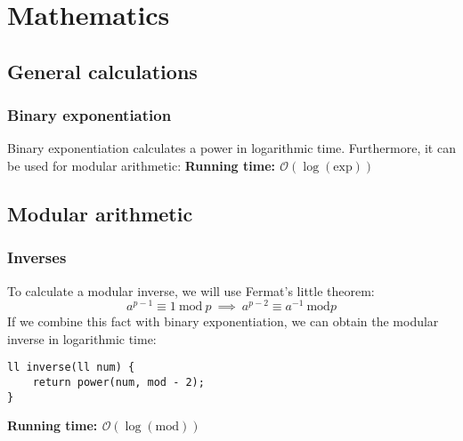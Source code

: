 \chapter{Mathematics}

\section{General calculations}
\subsection{Binary exponentiation}
Binary exponentiation calculates a power in logarithmic 
time. Furthermore, it can be used for modular arithmetic:
\noindent \textbf{\boldmath Running time: $\mathcal{O}(\log(\mathrm{exp}))$}


\newpage
\section{Modular arithmetic}
\subsection{Inverses}
To calculate a modular inverse, we will use Fermat's little theorem:
\[
	a^{p-1}\equiv 1 \ \mathrm{mod} \ p  \ \implies \  a^{p-2}\equiv a^{-1} \ \mathrm{mod} p
\]
If we combine this fact with binary exponentiation, we can obtain the 
modular inverse in logarithmic time:
\begin{verbatim}
ll inverse(ll num) {
    return power(num, mod - 2);
}
\end{verbatim}
\noindent \textbf{\boldmath Running time: $\mathcal{O}(\log(\mathrm{mod}))$}


